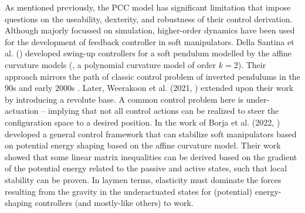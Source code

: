 As mentioned previously, the PCC model has significant limitation that impose questions on the useability, dexterity, and robustness of their control derivation. Although majorly focussed on simulation, higher-order dynamics have been used for the development of feedback controller in soft manipulators. Della Santina et al. (\cite{DellaSantina2021}) developed swing-up controllers for a soft pendulum modelled by the affine curvature models (\ie, a polynomial curvature model \cite{DellaSantina2020} of order $k = 2$). Their approach mirrors the path of classic control problem of inverted pendulums in the 90s and early 2000s \cite{Spong1996,Spong1996a,Ortega1998,Shiriaev1999Dec}. Later, Weerakoon et al. (2021, \cite{Weerakoon2021Dec}) extended upon their work by introducing a revolute base. A common control problem here is under-actuation \cite{Tedrake2022,Spong2006,Murray1994} -- implying that not all control actions can be realized to steer the configuration space to a desired position. In the work of Borja et al. (2022, \cite{Borja2022Apr}) developed a general control framework that can stabilize soft manipulators based on potential energy shaping based on the affine curvature model. Their work showed that some linear matrix inequalities can be derived based on the gradient of the potential energy related to the passive and active states, such that local stability can be proven. In laymen terms, elasticity must dominate the forces resulting from the gravity in the underactuated states for (potential) energy-shaping controllers (and mostly-like others) to work.